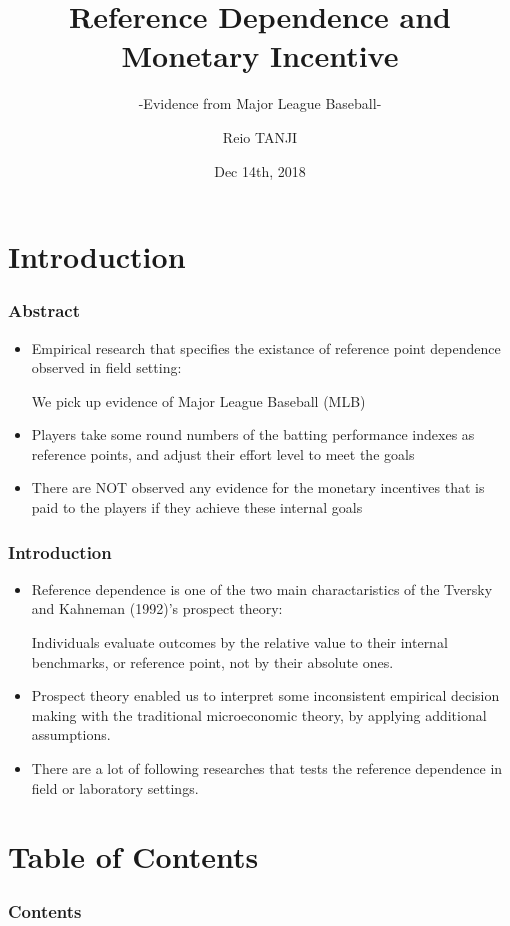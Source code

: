 \documentclass[dvipdfmx,12pt]{beamer}
\title{Reference Dependence and Monetary Incentive}
\subtitle{-Evidence from Major League Baseball-}
\author{Reio TANJI}
\date{Dec 14th, 2018}
\institute{Osaka University}
\begin{document}
\begin{frame}\frametitle{}
\titlepage
\end{frame}

\section{Introduction}
\begin{frame}\frametitle{Abstract}
  \begin{itemize}
    \item Empirical research that specifies the existance of reference point dependence observed in field setting:

    We pick up evidence of Major League Baseball (MLB)

    \item Players take some round numbers of the batting performance indexes as reference points, and adjust their effort level to meet the goals

    \item There are NOT observed any evidence for the monetary incentives that is paid to the players if they achieve these internal goals
  \end{itemize}
\end{frame}

\begin{frame}\frametitle{Introduction}
  \begin{itemize}
    \item Reference dependence is one of the two main charactaristics of the Tversky and Kahneman (1992)'s prospect theory:

    Individuals evaluate outcomes by the relative value to their internal benchmarks, or reference point, not by their absolute ones.

    \item Prospect theory enabled us to interpret some inconsistent empirical decision making with the traditional microeconomic theory, by applying additional assumptions.

    \item There are a lot of following researches that tests the reference dependence in field or laboratory settings.
  \end{itemize}
\end{frame}

\section*{Table of Contents}
\begin{frame}\frametitle{Contents}
  \tableofcontents
\end{frame}
\end{document}
